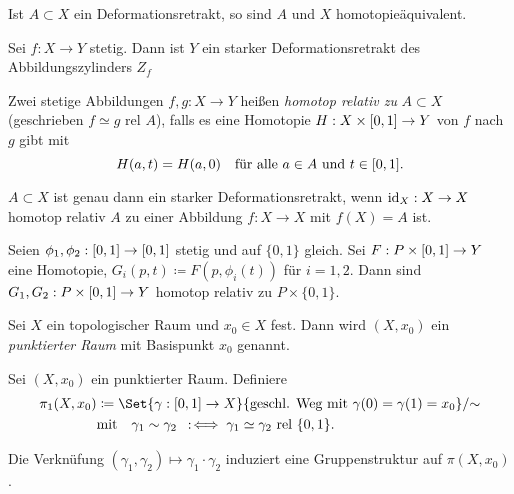 \documentclass{cheat-sheet}
\newcommand{\rel}{\text{ rel }} %
\begin{document}
\begin{bem}
  Ist $A \subset X$ ein Deformationsretrakt, so sind $A$ und $X$ homotopieäquivalent.
\end{bem}

\begin{bsp}
  Sei $f : X \to Y$ stetig. Dann ist $Y$ ein starker Deformationsretrakt des Abbildungszylinders $Z_f$
\end{bsp}


\begin{defn}
  Zwei stetige Abbildungen $f, g : X \to Y$ heißen \emph{homotop relativ zu} $A \subset X$ (geschrieben $f \simeq g \rel A$), falls es eine Homotopie $H : X \times \left[ 0, 1 \right] \to Y$ von $f$ nach $g$ gibt mit
  \[
    H(a,t) = H(a,0) \quad
    \text{für alle $a \in A$ und $t \in \left[ 0, 1 \right]$.}
  \]
\end{defn}

\begin{bem}
  $A \subset X$ ist genau dann ein starker Deformationsretrakt, wenn $\mathrm{id}_X : X \to X$ homotop relativ $A$ zu einer Abbildung $f : X \to X$ mit $f(X) = A$ ist.
\end{bem}

\begin{lem}[Reparametrisierungslemma]
  Seien $\phi_1, \phi_2 : \left[ 0, 1 \right] \to \left[ 0, 1 \right]$ stetig und auf $\{ 0, 1 \}$ gleich. Sei $F : P \times \left[ 0, 1 \right] \to Y$ eine Homotopie, $G_i(p, t) \coloneqq F(p, \phi_i(t))$ für $i = 1,2$. Dann sind $G_1, G_2 : P \times \left[ 0, 1 \right] \to Y$ homotop relativ zu $P \times \{ 0, 1 \}$.
\end{lem}

\begin{defn}
  Sei $X$ ein topologischer Raum und $x_0 \in X$ fest. Dann wird $(X, x_0)$ ein \emph{punktierter Raum} mit Basispunkt $x_0$ genannt.
\end{defn}

\begin{defn}
  Sei $(X, x_0)$ ein punktierter Raum. Definiere
  \begin{align*}
    \pi_1(X, x_0) &\coloneqq \Set{ \gamma : \I \to X }{ \text{geschl. Weg mit } \gamma(0) = \gamma(1) = x_0 } / {\sim}\\
    & \text{mit} \quad \gamma_1 \sim \gamma_2 \coloniff \gamma_1 \simeq \gamma_2 \rel \{0,1\}.
  \end{align*}
\end{defn}

\begin{prop}
  Die Verknüfung $(\gamma_1, \gamma_2) \mapsto \gamma_1 \cdot \gamma_2$ induziert eine Gruppenstruktur auf $\pi(X, x_0)$.
\end{prop}
\end{document}
